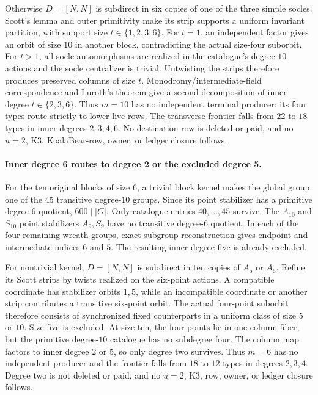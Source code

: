 \documentclass[11pt]{article}
\begin{document}
Otherwise \(D=[N,N]\) is subdirect in six copies of one of the three simple
socles.  Scott's lemma and outer primitivity make its strip supports a
uniform invariant partition, with support size \(t\in\{1,2,3,6\}\).
For \(t=1\), an independent factor gives an orbit of size \(10\) in another
block, contradicting the actual size-four suborbit.  For \(t>1\), all socle
automorphisms are realized in the catalogue's degree-\(10\) actions and the
socle centralizer is trivial.  Untwisting the strips therefore produces
preserved columns of size \(t\).  Monodromy/intermediate-field
correspondence and Luroth's theorem give a second decomposition of inner
degree \(t\in\{2,3,6\}\).  Thus \(m=10\) has no independent terminal
producer: its four types route strictly to lower live rows.  The transverse
frontier falls from \(22\) to \(18\) types in inner degrees \(2,3,4,6\).
No destination row is deleted or paid, and no \(u=2\), K3, KoalaBear-row,
owner, or ledger closure follows.

\paragraph{Inner degree 6 routes to degree 2 or the excluded degree 5.}
For the ten original blocks of size \(6\), a trivial block kernel makes the
global group one of the \(45\) transitive degree-\(10\) groups.  Since its
point stabilizer has a primitive degree-\(6\) quotient, \(600\mid |G|\).
Only catalogue entries \(40,\ldots,45\) survive.  The \(A_{10}\) and
\(S_{10}\) point stabilizers \(A_9,S_9\) have no transitive degree-\(6\)
quotient.  In each of the four remaining wreath groups, exact subgroup
reconstruction gives endpoint and intermediate indices \(6\) and \(5\).
The resulting inner degree five is already excluded.

For nontrivial kernel, \(D=[N,N]\) is subdirect in ten copies of \(A_5\)
or \(A_6\).  Refine its Scott strips by twists realized on the six-point
actions.  A compatible coordinate has stabilizer orbits \(1,5\), while an
incompatible coordinate or another strip contributes a transitive
six-point orbit.  The actual four-point suborbit therefore consists of
synchronized fixed counterparts in a uniform class of size \(5\) or
\(10\).  Size five is excluded.  At size ten, the four points lie in one
column fiber, but the primitive degree-\(10\) catalogue has no subdegree
four.  The column map factors to inner degree \(2\) or \(5\), so only
degree two survives.  Thus \(m=6\) has no independent producer and the
frontier falls from \(18\) to \(12\) types in degrees \(2,3,4\).  Degree
two is not deleted or paid, and no \(u=2\), K3, row, owner, or ledger
closure follows.
\end{document}
